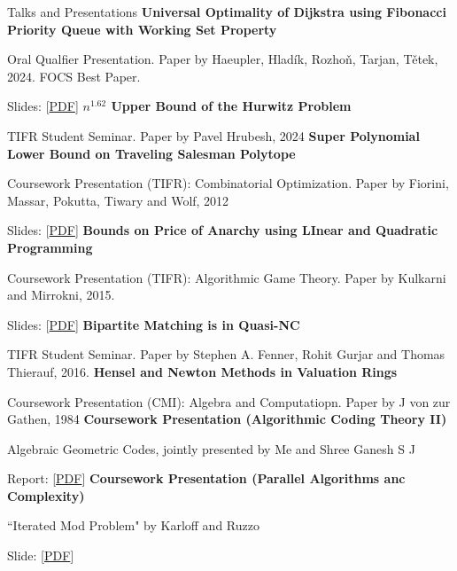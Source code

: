 \begin{rubric}{Talks and Presentations}
\entry*[2026]%
    \textbf{Universal Optimality of Dijkstra using Fibonacci Priority Queue with Working Set Property}

    Oral Qualfier Presentation. Paper by Haeupler, Hladík, Rozhoň, Tarjan, Tětek, 2024. FOCS Best Paper.

    Slides: [\href{https://sohamch08.github.io/assets/dijkstra-optimal.pdf}{PDF}]
\entry*[2026]%
    \textbf{$n^{1.62}$ Upper Bound of the Hurwitz Problem}

    TIFR Student Seminar. Paper by Pavel Hrubesh, 2024
\entry*[2025]%
    \textbf{Super Polynomial Lower Bound on Traveling Salesman Polytope}

    Coursework Presentation (TIFR): Combinatorial Optimization. Paper by Fiorini, Massar, Pokutta, Tiwary and Wolf, 2012

    Slides: [\href{https://sohamch08.github.io/assets/copt-presentation.pdf}{PDF}]
 \entry*[2025]%
    \textbf{Bounds on Price of Anarchy using LInear and Quadratic Programming}

    Coursework Presentation (TIFR): Algorithmic Game Theory. Paper by Kulkarni and Mirrokni, 2015.

    Slides: [\href{https://sohamch08.github.io/assets/agt-presentation.pdf}{PDF}]
\entry*[2025]%
	\textbf{Bipartite Matching is in \textsf{Quasi-NC}}

    TIFR Student Seminar. Paper by Stephen A. Fenner, Rohit Gurjar and Thomas Thierauf, 2016.
\entry*[2024]%
	\textbf{Hensel and Newton Methods in Valuation Rings}

    Coursework Presentation (CMI): Algebra and Computatiopn. Paper by J von zur Gathen, 1984
\entry*[2023]%
	\textbf{Coursework Presentation (Algorithmic Coding Theory II)}

    Algebraic Geometric Codes, jointly presented by Me and Shree Ganesh S J

    Report: [\href{https://sohamch08.github.io/assets/act-report.pdf}{PDF}]
\entry*[2023]%
	\textbf{Coursework Presentation (Parallel Algorithms anc Complexity)}

    ``Iterated Mod Problem" by Karloff and Ruzzo

    Slide: [\href{https://sohamch08.github.io/assets/parallel-presentation-iterated-mod.pdf}{PDF}]
\end{rubric}